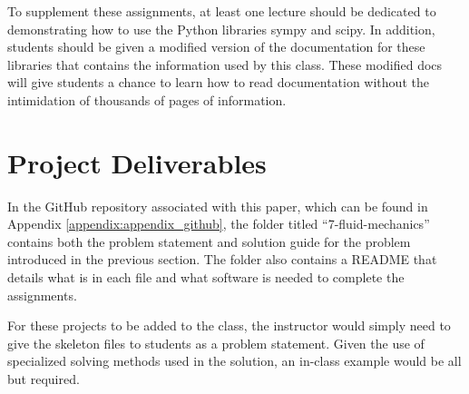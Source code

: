 To supplement these assignments, at least
one lecture should be dedicated to demonstrating how to use the Python libraries sympy and scipy. In addition,
students should be given a modified version of the documentation for these libraries that contains the information
used by this class. These modified docs will give students a chance to learn how to read documentation without the
intimidation of thousands of pages of information.

\section{Project Deliverables}

In the GitHub repository associated with this paper, which can be found in 
Appendix \ref{appendix:appendix_github}, the folder titled ``7-fluid-mechanics''
contains both the problem statement and solution guide for the problem introduced in 
the previous section. The folder also contains a README that details what is in each file and 
what software is needed to complete the assignments. 

For these projects to be added to the class, the instructor would simply need to give the 
skeleton files to students as a problem statement. Given the use of specialized solving
methods used in the solution, an in-class example would be all but required.
